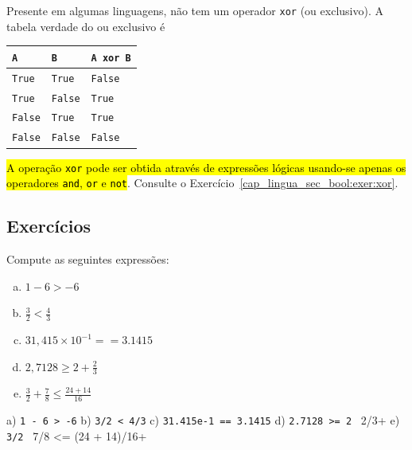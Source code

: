 \begin{obs}\label{cap_lingua_sec_bool:obs:xor}
  Presente em algumas linguagens, {\python} não tem um operador \lstinline+xor+ (ou exclusivo). A tabela verdade do ou exclusivo é
  \begin{center}
    \begin{tabular}[H]{ll|l}
      {\lstinline+A+}     & {\lstinline+B+}     & {\lstinline+A xor B+} \\\hline
      {\lstinline+True+}  & {\lstinline+True+}  & {\lstinline+False+}   \\
      {\lstinline+True+}  & {\lstinline+False+} & {\lstinline+True+}    \\
      {\lstinline+False+} & {\lstinline+True+}  & {\lstinline+True+}    \\
      {\lstinline+False+} & {\lstinline+False+} & {\lstinline+False+}   \\\hline    
    \end{tabular}
  \end{center}
  \hl{A operação {\lstinline+xor+} pode ser obtida através de expressões lógicas usando-se apenas os operadores {\lstinline+and+}, {\lstinline+or+} e {\lstinline+not+}}. Consulte o Exercício~\ref{cap_lingua_sec_bool:exer:xor}.
\end{obs}

\subsection{Exercícios}

\begin{exer}
  Compute as seguintes expressões:
  \begin{enumerate}[a)]
  \item $1 - 6 > -6$\\
  \item $\frac{3}{2} < \frac{4}{3}$\\
  \item $31,415\times 10^{-1} == 3.1415$\\
  \item $\displaystyle 2,7128 \geq 2 + \frac{2}{3}$
  \item $\displaystyle \frac{3}{2} + \frac{7}{8} \leq \frac{24 + 14}{16}$
  \end{enumerate}
\end{exer}
\begin{resp}
  a) \lstinline+1 - 6 > -6+ b) \lstinline+3/2 < 4/3+ c) \lstinline+31.415e-1 == 3.1415+ d) \lstinline+2.7128 >= 2 + 2/3+ e) \lstinline+3/2 + 7/8 <= (24 + 14)/16+
\end{resp}

